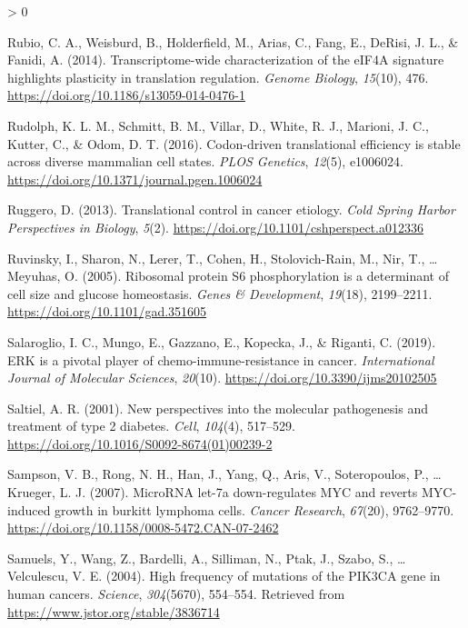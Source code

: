\documentclass[
  12pt,
  openany]{book}
\newlength{\cslhangindent}
\newenvironment{CSLReferences}[2] %
 {%
  \setlength{\parindent}{0pt}
  \ifodd #1 \everypar{\setlength{\hangindent}{\cslhangindent}}\ignorespaces\fi
  \ifnum #2 > 0
  \setlength{\parskip}{#2\baselineskip}
  \fi
 }%
 {}
\begin{document}
\begin{CSLReferences}{1}{0}
\leavevmode\hypertarget{ref-Rubio2014}{}%
Rubio, C. A., Weisburd, B., Holderfield, M., Arias, C., Fang, E., DeRisi, J. L., \& Fanidi, A. (2014). Transcriptome-wide characterization of the {eIF}4A signature highlights plasticity in translation regulation. \emph{Genome Biology}, \emph{15}(10), 476. \url{https://doi.org/10.1186/s13059-014-0476-1}

\leavevmode\hypertarget{ref-Rudolph2016}{}%
Rudolph, K. L. M., Schmitt, B. M., Villar, D., White, R. J., Marioni, J. C., Kutter, C., \& Odom, D. T. (2016). Codon-driven translational efficiency is stable across diverse mammalian cell states. \emph{{PLOS} Genetics}, \emph{12}(5), e1006024. \url{https://doi.org/10.1371/journal.pgen.1006024}

\leavevmode\hypertarget{ref-Ruggero2013}{}%
Ruggero, D. (2013). Translational control in cancer etiology. \emph{Cold Spring Harbor Perspectives in Biology}, \emph{5}(2). \url{https://doi.org/10.1101/cshperspect.a012336}

\leavevmode\hypertarget{ref-Ruvinsky2005}{}%
Ruvinsky, I., Sharon, N., Lerer, T., Cohen, H., Stolovich-Rain, M., Nir, T., \ldots{} Meyuhas, O. (2005). Ribosomal protein S6 phosphorylation is a determinant of cell size and glucose homeostasis. \emph{Genes \& Development}, \emph{19}(18), 2199--2211. \url{https://doi.org/10.1101/gad.351605}

\leavevmode\hypertarget{ref-Salaroglio2019}{}%
Salaroglio, I. C., Mungo, E., Gazzano, E., Kopecka, J., \& Riganti, C. (2019). {ERK} is a pivotal player of chemo-immune-resistance in cancer. \emph{International Journal of Molecular Sciences}, \emph{20}(10). \url{https://doi.org/10.3390/ijms20102505}

\leavevmode\hypertarget{ref-Saltiel2001}{}%
Saltiel, A. R. (2001). New perspectives into the molecular pathogenesis and treatment of type 2 diabetes. \emph{Cell}, \emph{104}(4), 517--529. \url{https://doi.org/10.1016/S0092-8674(01)00239-2}

\leavevmode\hypertarget{ref-Sampson2007}{}%
Sampson, V. B., Rong, N. H., Han, J., Yang, Q., Aris, V., Soteropoulos, P., \ldots{} Krueger, L. J. (2007). {MicroRNA} let-7a down-regulates {MYC} and reverts {MYC}-induced growth in burkitt lymphoma cells. \emph{Cancer Research}, \emph{67}(20), 9762--9770. \url{https://doi.org/10.1158/0008-5472.CAN-07-2462}

\leavevmode\hypertarget{ref-Samuels2004}{}%
Samuels, Y., Wang, Z., Bardelli, A., Silliman, N., Ptak, J., Szabo, S., \ldots{} Velculescu, V. E. (2004). High frequency of mutations of the {PIK}3CA gene in human cancers. \emph{Science}, \emph{304}(5670), 554--554. Retrieved from \url{https://www.jstor.org/stable/3836714}


\end{CSLReferences}
\end{document}

